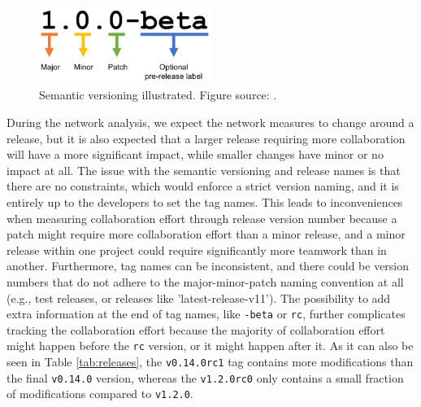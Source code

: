 \begin{figure}[!htbp]
    \centering
    \includegraphics[width=0.5\textwidth]{figures/semantic-versioning.png}
    \caption{Semantic versioning illustrated. Figure source: \cite{mariogripSemanticVersioningUT2018}.}
    \label{fig:semver}
\end{figure}

During the network analysis, we expect the network measures to change around a release, but it is also expected that a larger release requiring more collaboration will have a more significant impact, while smaller changes have minor or no impact at all. The issue with the semantic versioning and release names is that there are no constraints, which would enforce a strict version naming, and it is entirely up to the developers to set the tag names. This leads to inconveniences when measuring collaboration effort through release version number because a patch might require more collaboration effort than a minor release, and a minor release within one project could require significantly more teamwork than in another. Furthermore, tag names can be inconsistent, and there could be version numbers that do not adhere to the major-minor-patch naming convention at all (e.g., test releases, or releases like 'latest-release-v11'). The possibility to add extra information at the end of tag names, like \texttt{-beta} or \texttt{rc}, further complicates tracking the collaboration effort because the majority of collaboration effort might happen before the \texttt{rc} version, or it might happen after it. As it can also be seen in Table \ref{tab:releases}, the \texttt{v0.14.0rc1} tag contains more modifications than the final \texttt{v0.14.0} version, whereas the \texttt{v1.2.0rc0} only contains a small fraction of modifications compared to \texttt{v1.2.0}.

